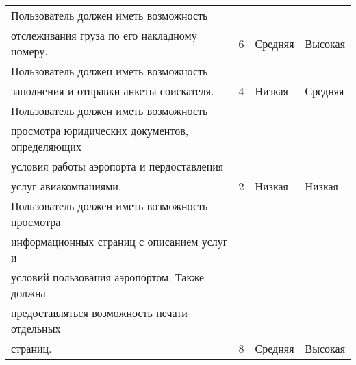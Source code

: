 \begin{table}[h!]
\begin{tabular}{|l|l|l|l|}
    Пользователь должен иметь возможность\\                  отслеживания груза по его накладному номеру.                                                                                                                                                                                                                                             & 6            & Средняя & Высокая        \\ \hline
    Пользователь должен иметь возможность\\                  заполнения и отправки анкеты соискателя.                                                                                                                                                                                                                                                 & 4            & Низкая  & Средняя        \\ \hline
    Пользователь должен иметь возможность\\                  просмотра юридических документов, определяющих\\                  условия работы аэропорта и пердоставления\\                  услуг авиакомпаниями.                                                                                                                                     & 2            & Низкая  & Низкая         \\ \hline
    Пользователь должен иметь возможность просмотра\\                  информационных страниц с описанием услуг и\\                  условий пользования аэропортом. Также должна\\                  предоставляться возможность печати отдельных\\                  страниц.                                                                         & 8            & Средняя & Высокая        \\ \hline
    \end{tabular}
\end{table}